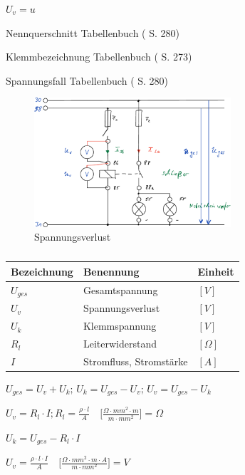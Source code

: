 $U_v = u$

Nennquerschnitt Tabellenbuch (\textcite{bell:2021:tabellenbuchKfz} S. 280)

Klemmbezeichnung Tabellenbuch (\textcite{bell:2021:tabellenbuchKfz} S. 273)

Spannungsfall Tabellenbuch (\textcite{bell:2021:tabellenbuchKfz} S. 280)

\begin{figure}[!ht]%
\centering
\includegraphics[width=0.65\textwidth]{images/Skizze/13_Spannungsverlust_Skizze.pdf}
\caption{Spannungsverlust}
\end{figure}

\begin{table}[!ht]%
\centering 
	\caption{}%
\begin{tabular}{@{}lll@{}}
\hline
\textbf{Bezeichnung} & \textbf{Benennung} & \textbf{Einheit} \\
\hline
$U_{ges}$ & Gesamtspannung & $[V]$ \\
$U_v$ & Spannungsverlust & $[V]$ \\
$U_k$ & Klemmspannung & $[V]$ \\
$R_l$ & Leiterwiderstand & $[\Omega]$ \\
$I$ & Stromfluss, Stromstärke & $[A]$ \\
\hline
\end{tabular} 
\end{table}

$U_{ges} = U_v + U_k;\, U_k = U_{ges} - U_v;\, U_v = U_{ges} - U_k$

$U_v = R_l \cdot I; R_l = \frac{\rho \cdot l}{A} \quad \bigl[\frac{\Omega \cdot mm^2 \cdot m}{m \cdot mm^2}\bigl] = \Omega$

$U_k = U_{ges} - R_l \cdot I$

$\boxed{U_v = \frac{\rho \cdot l \cdot I}{A}} \quad \bigl[\frac{\Omega \cdot mm^2 \cdot m \cdot A}{m \cdot mm^2}\bigl] = V$

